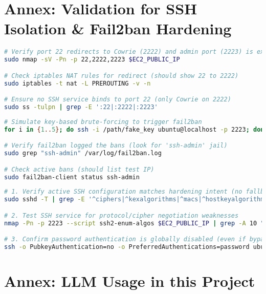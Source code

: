 \newpage

\section{Annex: Validation for SSH Isolation \& Fail2ban Hardening}  
\label{annex:network}
\begin{lstlisting}[language=bash, label={annexes:network}, caption={Network Isolation Verification}]  
# Verify port 22 redirects to Cowrie (2222) and admin port (2223) is exclusive  
sudo nmap -sV -Pn -p 22,2222,2223 $EC2_PUBLIC_IP  

# Check iptables NAT rules for redirect (should show 22 to 2222)  
sudo iptables -t nat -L PREROUTING -v -n  

# Ensure no SSH service binds to port 22 (only Cowrie on 2222)  
sudo ss -tulpn | grep -E ':22|:2222|:2223'  
\end{lstlisting}  




\begin{lstlisting}[language=bash, label={annexes:fail2ban}, caption={Fail2ban Efficacy Testing}]  
# Simulate key-based brute-forcing to trigger fail2ban  
for i in {1..5}; do ssh -i /path/fake_key ubuntu@localhost -p 2223; done  

# Verify fail2ban logged the bans (look for 'ssh-admin' jail)  
sudo grep "ssh-admin" /var/log/fail2ban.log  

# Check active bans (should list test IP)  
sudo fail2ban-client status ssh-admin  
\end{lstlisting}  






\begin{lstlisting}[language=bash, label={annexes:ssh-hardening}, caption={SSH Service Hardening Validation}]  
# 1. Verify active SSH configuration matches hardening intent (no fallback to weak protocols)  
sudo sshd -T | grep -E '^ciphers|^kexalgorithms|^macs|^hostkeyalgorithms'  

# 2. Test SSH service for protocol/cipher negotiation weaknesses  
nmap -Pn -p 2223 --script ssh2-enum-algos $EC2_PUBLIC_IP | grep -A 10 "algorithm negotiation"  

# 3. Confirm password authentication is globally disabled (even if bypass attempted)  
ssh -o PubkeyAuthentication=no -o PreferredAuthentications=password ubuntu@$EC2_PUBLIC_IP -p 2223  
\end{lstlisting}  






\newpage






\newpage


\newpage 


\section{Annex: LLM Usage in this Project}  
\label{annex:llm}
